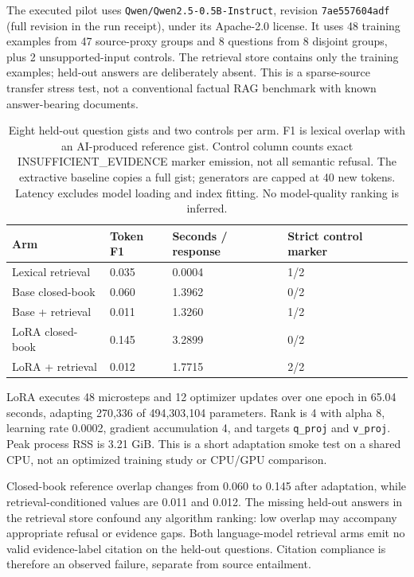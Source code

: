 The executed pilot uses \texttt{Qwen/Qwen2.5-0.5B-Instruct}, revision \texttt{7ae557604adf} (full revision in the run receipt), under its Apache-2.0 license. It uses 48 training examples from 47 source-proxy groups and 8 questions from 8 disjoint groups, plus 2 unsupported-input controls. The retrieval store contains only the training examples; held-out answers are deliberately absent. This is a sparse-source transfer stress test, not a conventional factual RAG benchmark with known answer-bearing documents.

\begin{table}[t]
\centering\small\setlength{\tabcolsep}{3pt}
\begin{tabular}{p{}p{}p{}p{}}
\toprule
Arm & Token F1 & Seconds / response & Strict control marker \\ \midrule
Lexical retrieval & 0.035 & 0.0004 & 1/2 \\
Base closed-book & 0.060 & 1.3962 & 0/2 \\
Base + retrieval & 0.011 & 1.3260 & 1/2 \\
LoRA closed-book & 0.145 & 3.2899 & 0/2 \\
LoRA + retrieval & 0.012 & 1.7715 & 2/2 \\
\bottomrule
\end{tabular}
\caption{Eight held-out question gists and two controls per arm. F1 is lexical overlap with an AI-produced reference gist. Control column counts exact INSUFFICIENT\_EVIDENCE marker emission, not all semantic refusal. The extractive baseline copies a full gist; generators are capped at 40 new tokens. Latency excludes model loading and index fitting. No model-quality ranking is inferred.}
\end{table}

LoRA executes 48 microsteps and 12 optimizer updates over one epoch in 65.04 seconds, adapting 270,336 of 494,303,104 parameters. Rank is 4 with alpha 8, learning rate 0.0002, gradient accumulation 4, and targets \texttt{q\_proj} and \texttt{v\_proj}. Peak process RSS is 3.21 GiB. This is a short adaptation smoke test on a shared CPU, not an optimized training study or CPU/GPU comparison.

Closed-book reference overlap changes from 0.060 to 0.145 after adaptation, while retrieval-conditioned values are 0.011 and 0.012. The missing held-out answers in the retrieval store confound any algorithm ranking: low overlap may accompany appropriate refusal or evidence gaps. Both language-model retrieval arms emit no valid evidence-label citation on the held-out questions. Citation compliance is therefore an observed failure, separate from source entailment.

